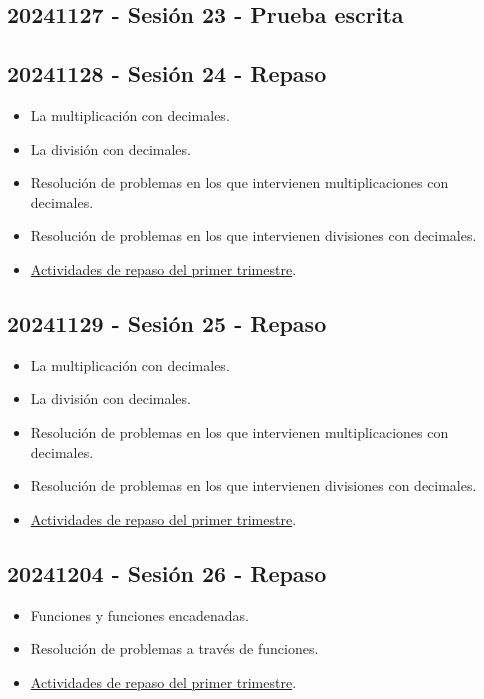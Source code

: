\documentclass[a4paper,12pt]{article}
\begin{document}
\subsection{20241127 - Sesión 23 - Prueba escrita}

\subsection{20241128 - Sesión 24 - Repaso}

\begin{itemize}
    \item La multiplicación con decimales.
    \item La división con decimales.
    \item Resolución de problemas en los que intervienen multiplicaciones con decimales.
    \item Resolución de problemas en los que intervienen divisiones con decimales.
    \item \href{https://sarcior.com/Matematicas5/RepasoT1.pdf}{Actividades de repaso del primer trimestre}.
\end{itemize}

\subsection{20241129 - Sesión 25 - Repaso}

\begin{itemize}
    \item La multiplicación con decimales.
    \item La división con decimales.
    \item Resolución de problemas en los que intervienen multiplicaciones con decimales.
    \item Resolución de problemas en los que intervienen divisiones con decimales.
    \item \href{https://sarcior.com/Matematicas5/RepasoT1.pdf}{Actividades de repaso del primer trimestre}.
\end{itemize}

\subsection{20241204 - Sesión 26 - Repaso}

\begin{itemize}
    \item Funciones y funciones encadenadas.
    \item Resolución de problemas a través de funciones.
    \item \href{https://sarcior.com/Matematicas5/RepasoT1.pdf}{Actividades de repaso del primer trimestre}.
\end{itemize}
\end{document}
